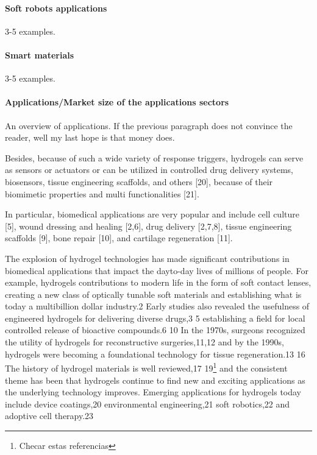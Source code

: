 \paragraph{Soft robots applications} 3-5 examples.

\paragraph{Smart materials} 3-5 examples.

\paragraph{Applications/Market size of the applications sectors} An overview of applications. If the previous paragraph does not convince the reader, well my last hope is that money does.

Besides, because of such a wide variety of response triggers, hydrogels can serve as sensors or actuators or can be utilized in controlled drug delivery systems, biosensors, tissue engineering scaffolds, and others [20], because of their biomimetic properties and multi functionalities [21]\citep{bustamantetorresHydrogelsClassificationAccording2021}.

In particular, biomedical applications are very popular and include cell culture [5], wound dressing and healing [2,6], drug delivery [2,7,8], tissue engineering scaffolds [9], bone repair [10], and cartilage regeneration [11]\citep{picchioniHydrogelsBasedDynamic2018}. 


The explosion of hydrogel technologies has made significant contributions in biomedical applications that impact the dayto-day lives of millions of people. 
For example, hydrogels contributions to modern life in the form of soft contact lenses, creating a new class of optically tunable soft materials and  establishing what is today a multibillion dollar industry.2 
Early studies also revealed the usefulness of engineered hydrogels for  delivering diverse drugs,3 5 establishing a field for local controlled release of bioactive compounds.6 10 
In the 1970s, surgeons recognized the utility of hydrogels for reconstructive  surgeries,11,12 and by the 1990s, hydrogels were becoming a  foundational technology for tissue regeneration.13 16 
The  history of hydrogel materials is well reviewed,17 19\footnote{Checar estas referencias} and the consistent theme has been that hydrogels continue to find new and exciting applications as the underlying technology improves.
Emerging applications for hydrogels  today include device coatings,20 environmental engineering,21  soft robotics,22 and adoptive cell therapy.23
\citep{correaTranslationalApplicationsHydrogels2021}




